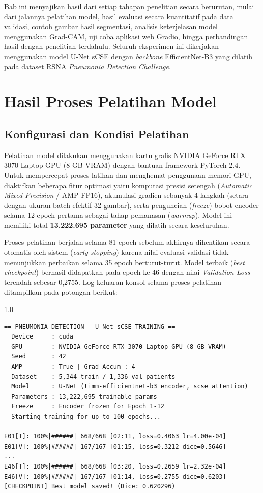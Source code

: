 \documentclass[12pt,a4paper,oneside]{book}
\begin{document}
Bab ini menyajikan hasil dari setiap tahapan penelitian secara berurutan, mulai dari jalannya pelatihan model, hasil evaluasi secara kuantitatif pada data validasi, contoh gambar hasil segmentasi, analisis keterjelasan model menggunakan Grad-CAM, uji coba aplikasi web Gradio, hingga perbandingan hasil dengan penelitian terdahulu. Seluruh eksperimen ini dikerjakan menggunakan model U-Net sCSE dengan \textit{backbone} EfficientNet-B3 yang dilatih pada dataset RSNA \textit{Pneumonia Detection Challenge}.

\section{Hasil Proses Pelatihan Model}

\subsection{Konfigurasi dan Kondisi Pelatihan}

Pelatihan model dilakukan menggunakan kartu grafis NVIDIA GeForce RTX 3070 Laptop GPU (8 GB VRAM) dengan bantuan framework PyTorch 2.4. Untuk mempercepat proses latihan dan menghemat penggunaan memori GPU, diaktifkan beberapa fitur optimasi yaitu komputasi presisi setengah (\textit{Automatic Mixed Precision} / AMP FP16), akumulasi gradien sebanyak 4 langkah (setara dengan ukuran batch efektif 32 gambar), serta penguncian (\textit{freeze}) bobot encoder selama 12 epoch pertama sebagai tahap pemanasan (\textit{warmup}). Model ini memiliki total \textbf{13.222.695 parameter} yang dilatih secara keseluruhan.

Proses pelatihan berjalan selama 81 epoch sebelum akhirnya dihentikan secara otomatis oleh sistem (\textit{early stopping}) karena nilai evaluasi validasi tidak menunjukkan perbaikan selama 35 epoch berturut-turut. Model terbaik (\textit{best checkpoint}) berhasil didapatkan pada epoch ke-46 dengan nilai \textit{Validation Loss} terendah sebesar 0,2755. Log keluaran konsol selama proses pelatihan ditampilkan pada potongan berikut:

\begin{spacing}{1.0}
\begin{lstlisting}
== PNEUMONIA DETECTION - U-Net sCSE TRAINING ==
  Device     : cuda
  GPU        : NVIDIA GeForce RTX 3070 Laptop GPU (8 GB VRAM)
  Seed       : 42
  AMP        : True | Grad Accum : 4
  Dataset    : 5,344 train / 1,336 val patients
  Model      : U-Net (timm-efficientnet-b3 encoder, scse attention)
  Parameters : 13,222,695 trainable params
  Freeze     : Encoder frozen for Epoch 1-12
  Starting training for up to 100 epochs...

E01[T]: 100%|######| 668/668 [02:11, loss=0.4063 lr=4.00e-04]
E01[V]: 100%|######| 167/167 [01:15, loss=0.3212 dice=0.5646]
...
E46[T]: 100%|######| 668/668 [03:20, loss=0.2659 lr=2.32e-04]
E46[V]: 100%|######| 167/167 [01:14, loss=0.2755 dice=0.6203]
[CHECKPOINT] Best model saved! (Dice: 0.620296)
\end{lstlisting}
\end{spacing}
\end{document}
